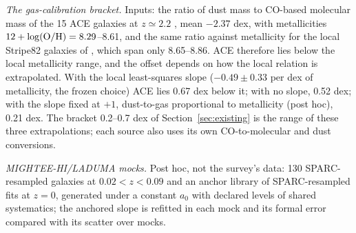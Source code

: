 \documentclass[fleqn,usenatbib]{mnras}
\begin{document}
\emph{The gas-calibration bracket.} Inputs: the ratio of dust mass to CO-based molecular mass of the 15 ACE galaxies at $z\simeq2.2$ \citep{Geesink2026}, mean $-2.37$ dex, with metallicities $12+\log({\rm O/H})=8.29$--8.61, and the same ratio against metallicity for the local Stripe82 galaxies of \citet{Bertemes2018}, which span only 8.65--8.86. ACE therefore lies below the local metallicity range, and the offset depends on how the local relation is extrapolated. With the local least-squares slope ($-0.49\pm0.33$ per dex of metallicity, the frozen choice) ACE lies 0.67 dex below it; with no slope, 0.52 dex; with the slope fixed at $+1$, dust-to-gas proportional to metallicity (post hoc), 0.21 dex. The bracket 0.2--0.7 dex of Section~\ref{sec:existing} is the range of these three extrapolations; each source also uses its own CO-to-molecular and dust conversions.

\emph{MIGHTEE-HI/LADUMA mocks.} Post hoc, not the survey's data: 130 SPARC-resampled galaxies at $0.02<z<0.09$ and an anchor library of SPARC-resampled fits at $z=0$, generated under a constant $a_0$ with declared levels of shared systematics; the anchored slope is refitted in each mock and its formal error compared with its scatter over mocks.
\end{document}

